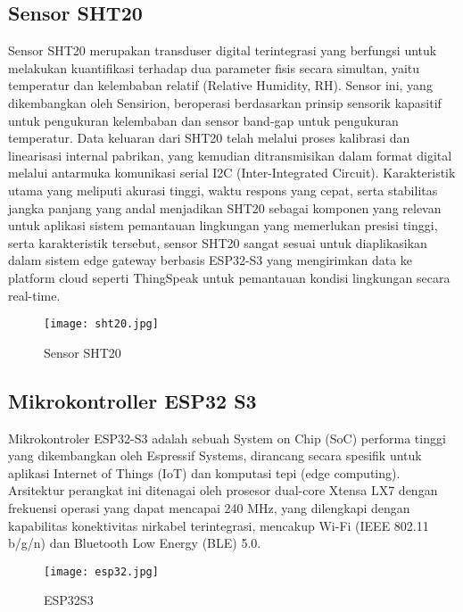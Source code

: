 \documentclass[a4paper, 12pt]{article}
\begin{document}
\subsection{Sensor SHT20}
Sensor SHT20 merupakan transduser digital terintegrasi yang berfungsi untuk melakukan kuantifikasi terhadap dua parameter fisis secara simultan, yaitu temperatur dan kelembaban relatif (Relative Humidity, RH). Sensor ini, yang dikembangkan oleh Sensirion, beroperasi berdasarkan prinsip sensorik kapasitif untuk pengukuran kelembaban dan sensor band-gap untuk pengukuran temperatur. Data keluaran dari SHT20 telah melalui proses kalibrasi dan linearisasi internal pabrikan, yang kemudian ditransmisikan dalam format digital melalui antarmuka komunikasi serial I2C (Inter-Integrated Circuit). Karakteristik utama yang meliputi akurasi tinggi, waktu respons yang cepat, serta stabilitas jangka panjang yang andal menjadikan SHT20 sebagai komponen yang relevan untuk aplikasi sistem pemantauan lingkungan yang memerlukan presisi tinggi, serta karakteristik tersebut, sensor SHT20 sangat sesuai untuk diaplikasikan dalam sistem edge gateway berbasis ESP32-S3 yang mengirimkan data ke platform cloud seperti ThingSpeak untuk pemantauan kondisi lingkungan secara real-time.

\begin{figure}[H]
    \centering
    \texttt{[image: sht20.jpg]} 
    \caption{Sensor SHT20}
\end{figure}

\subsection{Mikrokontroller ESP32 S3}
Mikrokontroler ESP32-S3 adalah sebuah System on Chip (SoC) performa tinggi yang dikembangkan oleh Espressif Systems, dirancang secara spesifik untuk aplikasi Internet of Things (IoT) dan komputasi tepi (edge computing). Arsitektur perangkat ini ditenagai oleh prosesor dual-core Xtensa\textregistered{} LX7 dengan frekuensi operasi yang dapat mencapai 240 MHz, yang dilengkapi dengan kapabilitas konektivitas nirkabel terintegrasi, mencakup Wi-Fi (IEEE 802.11 b/g/n) dan Bluetooth Low Energy (BLE) 5.0.

\begin{figure}[H]
    \centering
    \texttt{[image: esp32.jpg]} 
    \caption{ESP32S3}
\end{figure}
\end{document}
